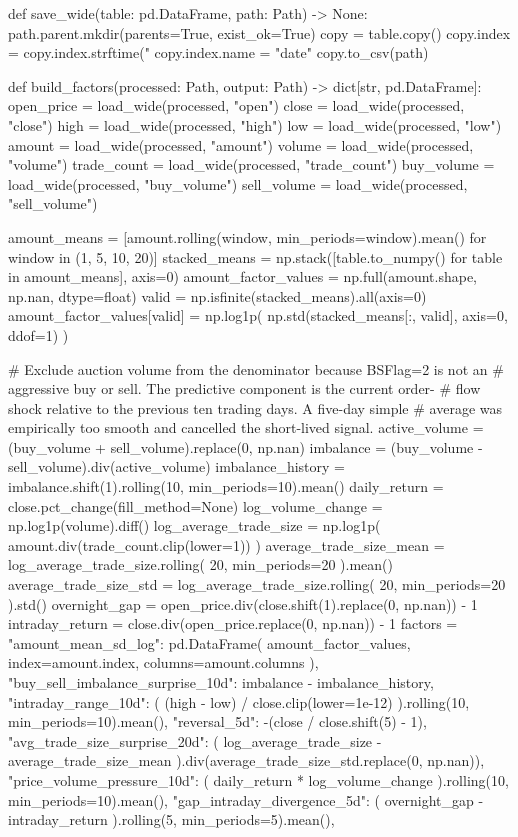 \documentclass[UTF8,a4paper,fontset=fandol]{ctexart}
\begin{document}
\begin{ProjectCode}
def save_wide(table: pd.DataFrame, path: Path) -> None:
    path.parent.mkdir(parents=True, exist_ok=True)
    copy = table.copy()
    copy.index = copy.index.strftime("%
    copy.index.name = "date"
    copy.to_csv(path)


def build_factors(processed: Path, output: Path) -> dict[str, pd.DataFrame]:
    open_price = load_wide(processed, "open")
    close = load_wide(processed, "close")
    high = load_wide(processed, "high")
    low = load_wide(processed, "low")
    amount = load_wide(processed, "amount")
    volume = load_wide(processed, "volume")
    trade_count = load_wide(processed, "trade_count")
    buy_volume = load_wide(processed, "buy_volume")
    sell_volume = load_wide(processed, "sell_volume")

    amount_means = [amount.rolling(window, min_periods=window).mean()
                    for window in (1, 5, 10, 20)]
    stacked_means = np.stack([table.to_numpy() for table in amount_means], axis=0)
    amount_factor_values = np.full(amount.shape, np.nan, dtype=float)
    valid = np.isfinite(stacked_means).all(axis=0)
    amount_factor_values[valid] = np.log1p(
        np.std(stacked_means[:, valid], axis=0, ddof=1)
    )

    # Exclude auction volume from the denominator because BSFlag=2 is not an
    # aggressive buy or sell. The predictive component is the current order-
    # flow shock relative to the previous ten trading days. A five-day simple
    # average was empirically too smooth and cancelled the short-lived signal.
    active_volume = (buy_volume + sell_volume).replace(0, np.nan)
    imbalance = (buy_volume - sell_volume).div(active_volume)
    imbalance_history = imbalance.shift(1).rolling(10, min_periods=10).mean()
    daily_return = close.pct_change(fill_method=None)
    log_volume_change = np.log1p(volume).diff()
    log_average_trade_size = np.log1p(
        amount.div(trade_count.clip(lower=1))
    )
    average_trade_size_mean = log_average_trade_size.rolling(
        20, min_periods=20
    ).mean()
    average_trade_size_std = log_average_trade_size.rolling(
        20, min_periods=20
    ).std()
    overnight_gap = open_price.div(close.shift(1).replace(0, np.nan)) - 1
    intraday_return = close.div(open_price.replace(0, np.nan)) - 1
    factors = {
        "amount_mean_sd_log": pd.DataFrame(
            amount_factor_values, index=amount.index, columns=amount.columns
        ),
        "buy_sell_imbalance_surprise_10d": imbalance - imbalance_history,
        "intraday_range_10d": (
            (high - low) / close.clip(lower=1e-12)
        ).rolling(10, min_periods=10).mean(),
        "reversal_5d": -(close / close.shift(5) - 1),
        "avg_trade_size_surprise_20d": (
            log_average_trade_size - average_trade_size_mean
        ).div(average_trade_size_std.replace(0, np.nan)),
        "price_volume_pressure_10d": (
            daily_return * log_volume_change
        ).rolling(10, min_periods=10).mean(),
        "gap_intraday_divergence_5d": (
            overnight_gap - intraday_return
        ).rolling(5, min_periods=5).mean(),
    }


\end{ProjectCode}
\end{document}
